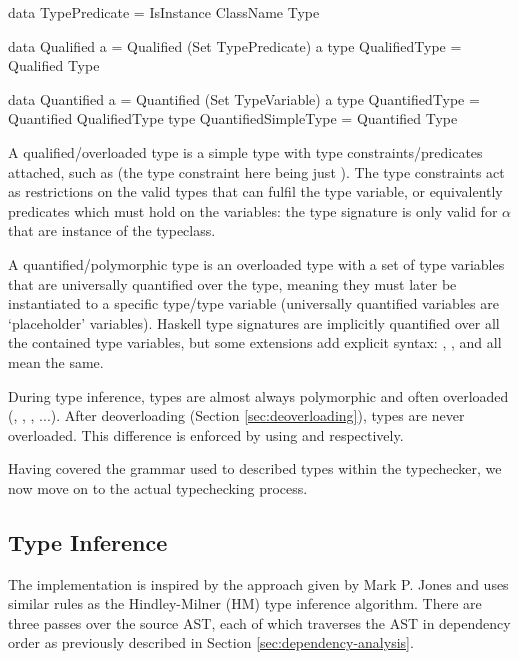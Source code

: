 \documentclass[dissertation.tex]{subfiles}
\begin{document}
{{        \begin{haskellfigure}
        data TypePredicate = IsInstance ClassName Type

        data Qualified a = Qualified (Set TypePredicate) a
        type QualifiedType = Qualified Type

        data Quantified a = Quantified (Set TypeVariable) a
        type QuantifiedType = Quantified QualifiedType
        type QuantifiedSimpleType = Quantified Type
        \end{haskellfigure}

        A qualified/overloaded type is a simple type with type constraints/predicates attached, such as  (the type constraint here being just ). The type constraints act as restrictions on the valid types that can fulfil the type variable, or equivalently predicates which must hold on the variables: the type signature is only valid for \(\alpha\) that are instance of the  typeclass. 

        A quantified/polymorphic type is an overloaded type with a set of type variables that are universally quantified over the type, meaning they must later be instantiated to a specific type/type variable (universally quantified variables are `placeholder' variables). Haskell type signatures are implicitly quantified over all the contained type variables, but some extensions add explicit syntax: , , and  all mean the same.

        During type inference, types are almost always polymorphic and often overloaded (, , , ...). After deoverloading (Section \ref{sec:deoverloading}), types are never overloaded. This difference is enforced by using  and  respectively.

        Having covered the grammar used to described types within the typechecker, we now move on to the actual typechecking process.
    }
    \subsection{Type Inference}
    {
        The implementation is inspired by the approach given by Mark P. Jones\cite{THIH} and uses similar rules as the Hindley-Milner (HM) type inference algorithm. There are three passes over the source AST, each of which traverses the AST in dependency order as previously described in Section \ref{sec:dependency-analysis}.

}}
\end{document}
